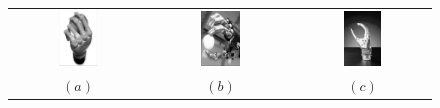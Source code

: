 \documentclass{article}
\begin{document}

\begin{figure}[!ht]
  \begin{center}
  \begin{tabular}{ccc}
    \includegraphics[width=0.30\textwidth]{hands_TB.eps} &
    \includegraphics[width=0.30\textwidth]{hands_DLRII.eps} &
    \includegraphics[width=0.30\textwidth]{hands_OB.eps} \\
    $(a)$ & $(b)$ & $(c)$
  \end{tabular}
  \end{center}
\end{figure}
\end{document}
